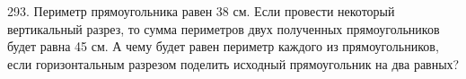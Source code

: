 293. Периметр прямоугольника равен 38 см. Если провести некоторый вертикальный разрез, то сумма периметров двух полученных прямоугольников будет равна 45 см. А чему будет равен периметр каждого из прямоугольников, если горизонтальным разрезом поделить исходный прямоугольник на два равных?\\
